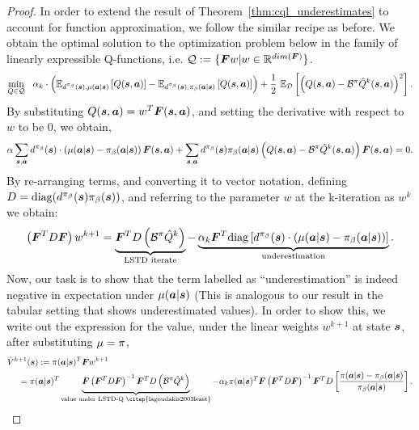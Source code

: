 \begin{proof} 
In order to extend the result of Theorem~\ref{thm:cql_underestimates} to account for function approximation, we follow the similar recipe as before. We obtain the optimal solution to the optimization problem below in the family of linearly expressible Q-functions, i.e. $\mathcal{Q} := \{\boldsymbol{F} w | w \in \mathbb{R}^{dim(\boldsymbol{F})} \}$. 
\begin{equation*}
    \min_{Q \in \mathcal{Q}}~~ \alpha_k \cdot \left(\mathbb{E}_{d^{\pi_\beta}(\boldsymbol{s}),\mu(\boldsymbol{a}|\boldsymbol{s})}\left[Q(\boldsymbol{s}, \boldsymbol{a})\right] - {\mathbb{E}_{d^{\pi_\beta}(\boldsymbol{s}),{\pi_\beta}(\boldsymbol{a}|\boldsymbol{s})}\left[Q(\boldsymbol{s}, \boldsymbol{a})\right]} \right) + \frac{1}{2}~ \mathbb{E}_{\mathcal{D}}\left[\left(Q(\boldsymbol{s}, \boldsymbol{a}) - \mathcal{B}^\pi \hat{Q}^{k} (\boldsymbol{s}, \boldsymbol{a}) \right)^2 \right].
\end{equation*}
By substituting $Q(\boldsymbol{s}, \boldsymbol{a}) = w^T \boldsymbol{F}(\boldsymbol{s}, \boldsymbol{a})$, and setting the derivative with respect to $w$ to be 0, we obtain,
\begin{align*}
    \alpha \sum_{\boldsymbol{s}, \boldsymbol{a}} d^{\pi_\beta}(\boldsymbol{s}) \cdot \left( \mu(\boldsymbol{a}|\boldsymbol{s}) - {\pi_\beta}(\boldsymbol{a}|\boldsymbol{s}) \right) \boldsymbol{F}(\boldsymbol{s}, \boldsymbol{a}) + \sum_{\boldsymbol{s}, \boldsymbol{a}} d^{\pi_\beta}(\boldsymbol{s}) {\pi_\beta}(\boldsymbol{a}|\boldsymbol{s}) \left( Q(\boldsymbol{s}, \boldsymbol{a}) - \mathcal{B}^\pi \hat{Q}^k(\boldsymbol{s}, \boldsymbol{a}) \right) \boldsymbol{F}(\boldsymbol{s}, \boldsymbol{a}) = 0.
\end{align*}
By re-arranging terms, and converting it to vector notation, defining $D = \text{diag}(d^{\pi_\beta}(\boldsymbol{s}){\pi_\beta}(\boldsymbol{s}))$, and referring to the parameter $w$ at the k-iteration as $w^k$ we obtain:
\begin{align*}
    \left(\boldsymbol{F}^T D \boldsymbol{F} \right) w^{k+1} = \underbrace{\boldsymbol{F}^T D \left( \mathcal{B}^\pi \hat{Q}^k \right)}_{\text{LSTD iterate}} - \underbrace{\alpha_k \boldsymbol{F}^T \text{diag}\left[d^{\pi_\beta}(\boldsymbol{s}) \cdot(\mu(\boldsymbol{a}|\boldsymbol{s}) - {\pi_\beta}(\boldsymbol{a}|\boldsymbol{s})) \right]}_{\text{underestimation}}.
\end{align*}
Now, our task is to show that the term labelled as ``underestimation'' is indeed negative in expectation under $\mu(\boldsymbol{a}|\boldsymbol{s})$ (This is analogous to our result in the tabular setting that shows underestimated values). In order to show this, we write out the expression for the value, under the linear weights $w^{k+1}$ at state $\boldsymbol{s}$, after substituting $\mu = \pi$,
\begin{align}
    \hat{V}^{k+1}(\bs) &:= \policy(\ba|\bs)^T \Qfeat w^{k+1}\\
    = \policy(&\ba|\bs)^T \underbrace{\Qfeat \left(\Qfeat^T D \Qfeat \right)^{-1} \Qfeat^T D \left(\bellman^\policy \hat{Q}^k \right)}_{\text{value under LSTD-Q~\citep{lagoudakis2003least}}} - \alpha_k \policy(\ba|\bs)^T \Qfeat \left(\Qfeat^T D \Qfeat \right)^{-1} \Qfeat^T D \left[\frac{\policy(\ba|\bs) - \behavior(\ba|\bs)}{\behavior(\ba|\bs)} \right].

\end{align}
\end{proof}
